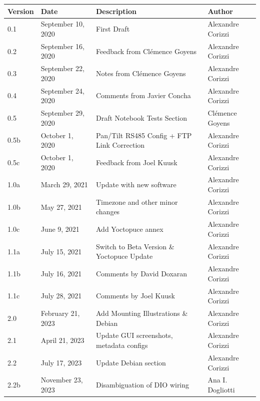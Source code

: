 \documentclass[a4paper,11pt,notitlepage]{article}
\begin{document}
\begin{tabularx}{\textwidth}{|l|l|X|l|}
\hline
\textbf{Version} & \textbf{Date}     & \textbf{Description} & \textbf{Author} \\ \hline
            0.1  & September 10, 2020     & First Draft & Alexandre Corizzi   \\ \hline
            0.2  & September 16, 2020     & Feedback from Clémence Goyens & 
			Alexandre Corizzi \\ \hline
            0.3  & September 22, 2020     & Notes from Clémence Goyens    
			& Alexandre Corizzi \\ \hline
            0.4  & September 24, 2020     & Comments from Javier Concha 
			& Alexandre Corizzi \\ \hline
			0.5  & September 29, 2020     & Draft Notebook Tests Section
			& Clémence Goyens \\ \hline
			0.5b  & October 1, 2020       &  Pan/Tilt RS485 Config + FTP Link 
			Correction & Alexandre Corizzi \\ \hline
			0.5c  & October 1, 2020       &  Feedback from Joel Kuusk
			& Alexandre Corizzi \\ \hline
			1.0a  & March 29, 2021   & Update with new software
			& Alexandre Corizzi \\ \hline
			1.0b  & May 27, 2021     & Timezone and other minor changes
			& Alexandre Corizzi \\ \hline
			1.0c  & June 9, 2021     & Add Yoctopuce annex
			& Alexandre Corizzi \\ \hline
			1.1a  & July 15, 2021    & Switch to Beta Version \& Yoctopuce Update
			& Alexandre Corizzi \\ \hline
			1.1b  & July 16, 2021    & Comments by David Doxaran  
			& Alexandre Corizzi \\ \hline
			1.1c  & July 28, 2021    & Comments by Joel Kuusk
			& Alexandre Corizzi \\ \hline
			2.0  & February 21, 2023    & Add Mounting Illustrations \& Debian
			& Alexandre Corizzi \\ \hline
			2.1  & April 21, 2023    & Update GUI screenshots, metadata configs
			& Alexandre Corizzi \\ \hline
			2.2  & July 17, 2023    & Update Debian section 
			& Alexandre Corizzi \\ \hline
			2.2b  & November 23, 2023  & Disambiguation of DIO wiring
			& Ana I. Dogliotti \\ \hline

\end{tabularx}
\newpage
\tableofcontents
\clearpage
\end{document}
